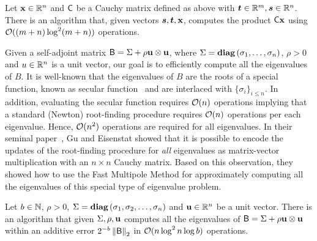 %
%
\begin{lemma}\cite{book:fast_matrix:Bini_Pan,FMM:CGR}\label{lem:fast_mm:gerasoulis}
Let $\mathbf{x}\in\mathbb{R}^n$ and ${\mathsf{C} }$ be a Cauchy matrix defined as above with $\bm{t}\in\mathbb{R}^m, \bm{s}\in\mathbb{R}^n$. There is an algorithm that, given vectors $\bm{s},\bm{t},\mathbf{x}$, computes the product ${\mathsf{C} }  \mathbf{x}$ using $\mathcal{O}((m+n)\log^2 (m+n))$ operations.
\end{lemma}
%
Given a self-adjoint matrix ${\mathsf{B} } = \Sigma + \rho {\mathbf u} \otimes {\mathbf u}$, where $\Sigma = \operatorname{\textbf{diag}}\left(\sigma_1 ,\ldots ,\sigma_n\right)$, $\rho >0$ and $u\in\mathbb{R}^n$ is a unit vector, our goal is to efficiently compute all the eigenvalues of $B$. It is well-known that the eigenvalues of $B$ are the roots of a special function, known as secular function~\cite{rank_one_update:Golub} and are interlaced with $\{\sigma_{i}\}_{i\leq n}$. In addition, evaluating the secular function requires $\mathcal{O}(n)$ operations implying that a standard (Newton) root-finding procedure requires $\mathcal{O}(n)$ operations per each eigenvalue. Hence, $\mathcal{O}(n^2)$ operations are required for all eigenvalues. In their seminal paper~\cite{Gu:update}, Gu and Eisenstat showed that it is possible to encode the updates of the root-finding procedure for \emph{all} eigenvalues as matrix-vector multiplication with an $n\times n$ Cauchy matrix. Based on this observation, they showed how to use the Fast Multipole Method for approximately computing all the eigenvalues of this special type of eigenvalue problem.
%
\begin{lemma}\cite{Gu:update}\label{lem:comp_eigs}
Let $b\in\mathbb{N}$, $\rho>0$, $\Sigma=\operatorname{\textbf{diag}}\left(\sigma_1,\sigma_2,\ldots , \sigma_n\right)$ and ${\mathbf u}\in\mathbb{R}^n$ be a unit vector. There is an algorithm that given $\Sigma, \rho, {\mathbf u}$ computes all the eigenvalues of ${\mathsf{B} }=\Sigma + \rho {\mathbf u} \otimes {\mathbf u}$ within an additive error $2^{-b}\left\|{\mathsf{B} }\right\|_2$ in $\mathcal{O}(n \log^2 n \log b )$ operations.
\end{lemma}
